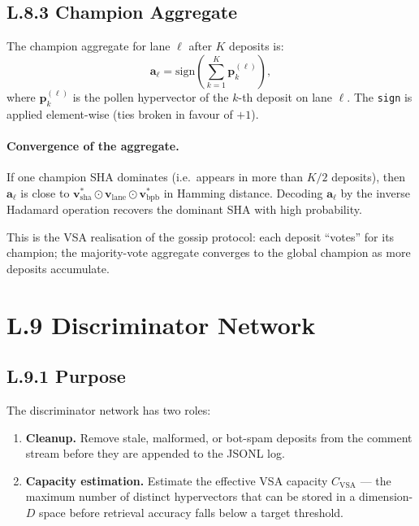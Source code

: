 \subsection*{L.8.3 \quad Champion Aggregate}

The champion aggregate for lane $\ell$ after $K$ deposits is:
\begin{equation}
  \mathbf{a}_{\ell} = \mathrm{sign}\!\left(\sum_{k=1}^{K} \mathbf{p}_{k}^{(\ell)}\right),
  \label{eq:aggregate}
\end{equation}
where $\mathbf{p}_{k}^{(\ell)}$ is the pollen hypervector of the
$k$-th deposit on lane $\ell$.  The \texttt{sign} is applied
element-wise (ties broken in favour of $+1$).

\paragraph{Convergence of the aggregate.}
If one champion SHA dominates (i.e.\ appears in more than $K/2$
deposits), then $\mathbf{a}_{\ell}$ is close to
$\mathbf{v}_{\text{sha}}^{*} \odot \mathbf{v}_{\text{lane}} \odot
\mathbf{v}_{\text{bpb}}^{*}$ in Hamming distance.  Decoding
$\mathbf{a}_{\ell}$ by the inverse Hadamard operation recovers the
dominant SHA with high probability.

This is the VSA realisation of the gossip protocol: each deposit
``votes'' for its champion; the majority-vote aggregate converges to
the global champion as more deposits accumulate.

\section*{L.9 \quad Discriminator Network}
\label{sec:appl-discriminator}

\subsection*{L.9.1 \quad Purpose}

The discriminator network has two roles:

\begin{enumerate}
\item \textbf{Cleanup.}  Remove stale, malformed, or bot-spam deposits
  from the comment stream before they are appended to the JSONL log.
\item \textbf{Capacity estimation.}  Estimate the effective VSA
  capacity $C_{\text{VSA}}$ — the maximum number of distinct
  hypervectors that can be stored in a dimension-$D$ space before
  retrieval accuracy falls below a target threshold.
\end{enumerate}

